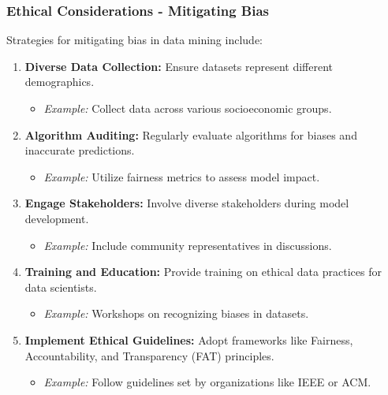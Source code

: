 \documentclass{beamer}
\begin{document}
\begin{frame}[fragile]
    \frametitle{Ethical Considerations - Mitigating Bias}
    Strategies for mitigating bias in data mining include:
    
    \begin{enumerate}
        \item \textbf{Diverse Data Collection:} 
        Ensure datasets represent different demographics.
        \begin{itemize}
            \item \textit{Example:} Collect data across various socioeconomic groups.
        \end{itemize}

        \item \textbf{Algorithm Auditing:} 
        Regularly evaluate algorithms for biases and inaccurate predictions.
        \begin{itemize}
            \item \textit{Example:} Utilize fairness metrics to assess model impact.
        \end{itemize}

        \item \textbf{Engage Stakeholders:} 
        Involve diverse stakeholders during model development.
        \begin{itemize}
            \item \textit{Example:} Include community representatives in discussions.
        \end{itemize}

        \item \textbf{Training and Education:} 
        Provide training on ethical data practices for data scientists.
        \begin{itemize}
            \item \textit{Example:} Workshops on recognizing biases in datasets.
        \end{itemize}

        \item \textbf{Implement Ethical Guidelines:} 
        Adopt frameworks like Fairness, Accountability, and Transparency (FAT) principles.
        \begin{itemize}
            \item \textit{Example:} Follow guidelines set by organizations like IEEE or ACM.
        \end{itemize}
    \end{enumerate}
\end{frame}
\end{document}
